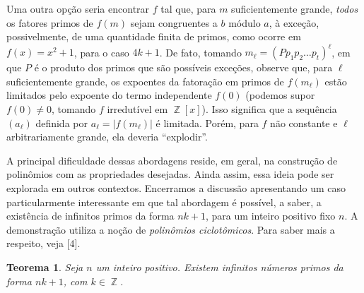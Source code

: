 \documentclass{hipatia}
\DeclareMathOperator{\Z}{\mathbb{Z}}
\newtheorem{theorem*}{Teorema}
\begin{document}
Uma outra opção seria encontrar $f$ tal que, para $m$ suficientemente grande, \textit{todos} os fatores primos de $f(m)$ sejam congruentes a $b$ módulo $a$, à exceção, possivelmente, de uma quantidade finita de primos, como ocorre em $f(x)=x^2+1$, para o caso $4k+1$. De fato, tomando $m_\ell=(Pp_1p_2\ldots p_t)^{\ell}$, em que $P$ é o produto dos primos que são possíveis exceções, observe que, para $\ell$ suficientemente grande, os expoentes da fatoração em primos de $f(m_\ell)$ estão limitados pelo expoente do termo independente $f(0)$ (podemos supor $f(0) \ne 0$, tomando $f$ irredutível em $\Z[x]$). Isso significa que a sequência $(a_\ell)$ definida por $a_\ell=|f(m_\ell)|$ é limitada. Porém, para $f$ não constante e $\ell$ arbitrariamente grande, ela deveria ``explodir''.

A principal dificuldade dessas abordagens reside, em geral, na construção de polinômios com as propriedades desejadas. Ainda assim, essa ideia pode ser explorada em outros contextos. Encerramos a discussão apresentando um caso particularmente interessante em que tal abordagem é possível, a saber, a existência de infinitos primos da forma $nk+1$, para um inteiro positivo fixo $n$. A demonstração utiliza a noção de \textit{polinômios ciclotômicos}. Para saber mais a respeito, veja [4].

\begin{theorem*}
Seja $n$ um inteiro positivo. Existem infinitos números primos da forma $nk+1$, com $k \in \Z$.
\end{theorem*}
\end{document}
